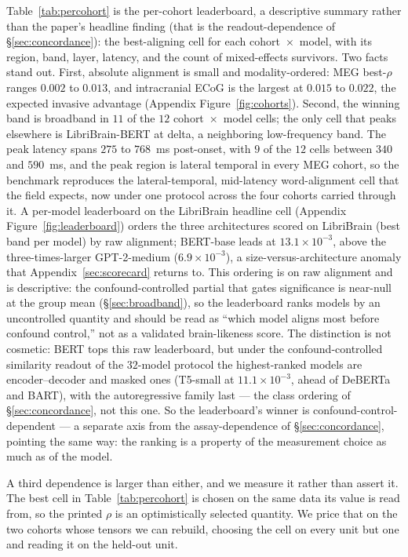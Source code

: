 \documentclass{article}
\begin{document}
Table~\ref{tab:percohort} is the per-cohort leaderboard, a descriptive summary
rather than the paper's headline finding (that is the readout-dependence of
\S\ref{sec:concordance}): the best-aligning cell for each cohort~$\times$~model,
with its region, band, layer, latency, and the count of mixed-effects survivors. Two facts stand out. First, absolute
alignment is small and modality-ordered: MEG best-$\rho$ ranges $0.002$ to
$0.013$, and intracranial ECoG is the largest at $0.015$ to $0.022$, the
expected invasive advantage (Appendix Figure~\ref{fig:cohorts}). Second, the winning band
is broadband in $11$ of the $12$ cohort~$\times$~model cells; the only cell that
peaks elsewhere is LibriBrain-BERT at delta, a neighboring low-frequency band.
The peak latency spans $275$ to $768$~ms post-onset, with $9$ of the $12$ cells
between $340$ and $590$~ms, and the peak region is lateral temporal in every MEG
cohort, so the benchmark reproduces the
lateral-temporal, mid-latency word-alignment cell that the field expects, now
under one protocol across the four cohorts carried through it. A per-model leaderboard on the LibriBrain
headline cell (Appendix Figure~\ref{fig:leaderboard}) orders the three architectures scored on
LibriBrain (best band per model) by raw alignment; BERT-base leads at $13.1\times10^{-3}$, above the
three-times-larger GPT-2-medium ($6.9\times10^{-3}$), a size-versus-architecture
anomaly that Appendix~\ref{sec:scorecard} returns to. This
ordering is on raw alignment and is descriptive: the confound-controlled partial
that gates significance is near-null at the group mean
(\S\ref{sec:broadband}), so the leaderboard ranks models by an uncontrolled
quantity and should be read as ``which model aligns most before confound control,''
not as a validated brain-likeness score. The distinction is not cosmetic: BERT tops
this raw leaderboard, but under the confound-controlled similarity readout of the
$32$-model protocol the highest-ranked models are encoder--decoder and masked ones
(T5-small at $11.1\times10^{-3}$, ahead of DeBERTa and BART), with the autoregressive
family last --- the class ordering of \S\ref{sec:concordance}, not this one. So the
leaderboard's winner is confound-control-dependent --- a separate axis from the
assay-dependence of \S\ref{sec:concordance}, pointing the same way: the ranking is a
property of the measurement choice as much as of the model.

A third dependence is larger than either, and we measure it rather than assert it. The best cell
in Table~\ref{tab:percohort} is chosen on the same data its value is read from, so the printed
$\rho$ is an optimistically selected quantity. We price that on the two cohorts whose tensors we
can rebuild, choosing the cell on every unit but one and reading it on the held-out unit.
\end{document}
